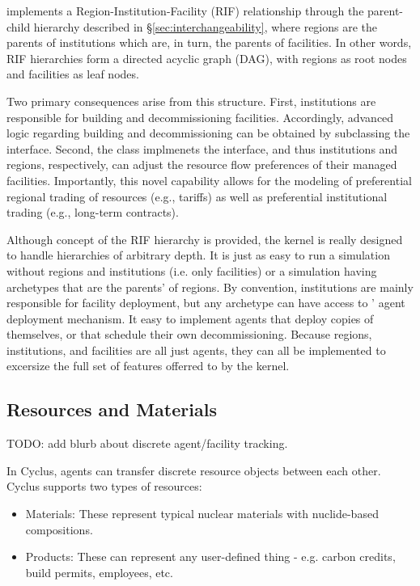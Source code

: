 \Cyclus implements a Region-Institution-Facility (RIF) relationship through the
parent-child hierarchy described in \S \ref{sec:interchangeability}, where
regions are the parents of institutions which are, in turn, the parents of
facilities. In other words, RIF hierarchies form a directed acyclic graph (DAG),
with regions as root nodes and facilities as leaf nodes.

Two primary consequences arise from this structure. First, institutions are
responsible for building and decommissioning facilities. Accordingly, advanced
logic regarding building and decommissioning can be obtained by subclassing the
 interface. Second, the  class implmenets the
 interface, and thus institutions and regions, respectively, can
adjust the resource flow preferences of their managed facilities. Importantly,
this novel capability allows for the modeling of preferential regional trading
of resources (e.g., tariffs) as well as preferential institutional trading
(e.g., long-term contracts).

Although concept of the RIF hierarchy is provided, the \Cyclus kernel is
really designed to handle hierarchies of arbitrary depth.  It is just as easy
to run a simulation without regions and institutions (i.e.  only facilities)
or a simulation having archetypes that are the parents' of regions.  By
convention, institutions are mainly responsible for facility deployment, but
any archetype can have access to \Cyclus' agent deployment mechanism.  It easy
to implement agents that deploy copies of themselves, or that schedule their
own decommissioning.  Because regions, institutions, and facilities are all
just agents, they can all be implemented to excersize the full set of features
offerred to by the \Cyclus kernel.

\subsection{Resources and Materials}

TODO: add blurb about discrete agent/facility tracking.

In Cyclus, agents can transfer discrete resource objects between each other.
Cyclus supports two types of resources:

\begin{itemize}

  \item Materials: These represent typical nuclear materials with
      nuclide-based compositions.

  \item Products: These can represent any user-defined thing - e.g. carbon
      credits, build permits, employees, etc.

\end{itemize}

